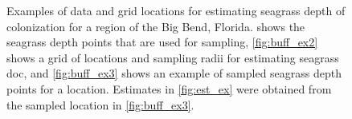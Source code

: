\documentclass[letterpaper,12pt,oneside]{article}\usepackage[]{graphicx}\usepackage[]{color}
\begin{document}
\begin{figure}
\caption{Examples of data and grid locations for estimating seagrass depth of colonization for a region of the Big Bend, Florida.   shows the seagrass depth points that are used for sampling, \cref{fig:buff_ex2} shows a grid of locations and sampling radii for estimating seagrass \ac{doc}, and \cref{fig:buff_ex3} shows an example of sampled seagrass depth points for a location.  Estimates in \cref{fig:est_ex} were obtained from the sampled location in \cref{fig:buff_ex3}.}
\label{fig:buff_ex}
\end{figure}

\end{document}
